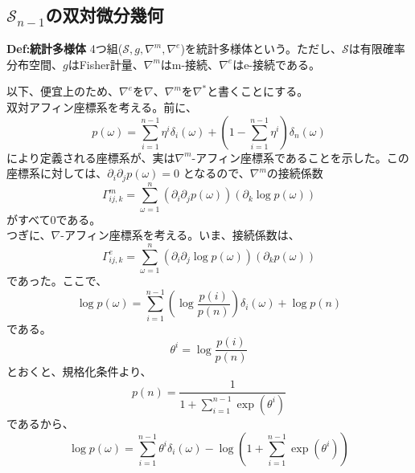\documentclass[a4paper,11pt]{jsarticle}
\numberwithin{equation}{section}
\begin{document}
\subsection{$\mathcal{S}_{n-1}$の双対微分幾何}

\begin{itembox}[l]{\textbf{Def:統計多様体}}
    4つ組($\mathcal{S},g,\nabla^{m},\nabla^{e}$)を統計多様体という。ただし、$\mathcal{S}$は有限確率分布空間、$g$はFisher計量、$\nabla^{m}$はm-接続、$\nabla^{e}$はe-接続である。
\end{itembox}
以下、便宜上のため、$\nabla^{e}$を$\nabla$、$\nabla^{m}$を$\nabla^*$と書くことにする。\\

双対アフィン座標系を考える。前に、
\begin{equation}
    p(\omega) = \sum_{i=1}^{n-1} \eta^i \delta_i(\omega) + (1-\sum_{i=1}^{n-1} \eta^i) \delta_n(\omega)
\end{equation}
により定義される座標系が、実は$\nabla^{m}$-アフィン座標系であることを示した。この座標系に対しては、$\partial_i \partial_j p(\omega) = 0$
となるので、$\nabla^{m}$の接続係数
\begin{equation}
    \Gamma_{ij,k}^{m} = \sum_{\omega=1}^{n} (\partial_i \partial_j p(\omega)) (\partial_k \log p(\omega))
\end{equation}
がすべて0である。\\
つぎに、$\nabla$-アフィン座標系を考える。いま、接続係数は、
\begin{equation}
    \Gamma_{ij,k} ^{e} = \sum_{\omega=1}^{n} (\partial_i \partial_j \log p(\omega)) (\partial_k p(\omega))
\end{equation}
であった。ここで、
\begin{equation}
    \log p(\omega) = \sum_{i=1}^{n-1} \left(\log \frac{p(i)}{p(n)}\right) \delta_i(\omega) + \log p(n) 
\end{equation}
である。
\begin{equation}
\theta^i = \log \frac{p(i)}{p(n)}
\end{equation}
とおくと、規格化条件より、
\begin{equation}
    p(n) = \frac{1}{1+\sum_{i=1}^{n-1} \exp(\theta^i)} \label{eq:4}
\end{equation}
であるから、
\begin{equation}
    \log p(\omega) = \sum_{i=1}^{n-1} \theta^i \delta_i(\omega) - \log(1+\sum_{i=1}^{n-1} \exp(\theta^i))
\end{equation}
\end{document}
